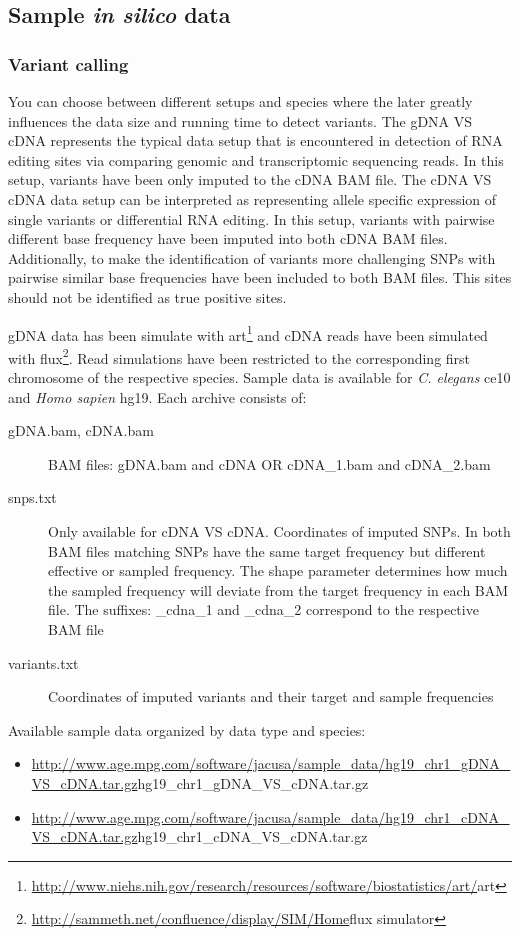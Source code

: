 \documentclass[10pt,a4paper,draft]{article}
\begin{document}
\subsection{Sample \textit{in silico} data}
\subsubsection{Variant calling}
You can choose between different setups and species where the later greatly influences the data size 
and running time to detect variants. The gDNA VS cDNA represents the typical data setup that is 
encountered in detection of RNA editing sites via comparing genomic and transcriptomic sequencing reads. 
In this setup, variants have been only imputed to the cDNA BAM file. The cDNA VS cDNA data setup can be interpreted as
representing allele specific expression of single variants or differential RNA editing. In this
setup, variants with pairwise different base frequency have been imputed into both cDNA BAM files.
Additionally, to make the identification of variants more challenging SNPs with pairwise similar base
frequencies have been included to both BAM files. This sites should not be identified as true
positive sites.

gDNA data has been simulate with
art\footnote{\url{http://www.niehs.nih.gov/research/resources/software/biostatistics/art/}{art}}
and cDNA reads have been simulated with
flux\footnote{\url{http://sammeth.net/confluence/display/SIM/Home}{flux simulator}}. Read
simulations have been restricted to the corresponding first chromosome of the respective species.
Sample data is available for \textit{C. elegans} ce10 and \textit{Homo sapien} hg19. Each archive
consists of:
\begin{description}
  \item[gDNA.bam, cDNA.bam] BAM files: gDNA.bam and cDNA OR cDNA\_1.bam and cDNA\_2.bam
  \item[snps.txt] Only available for cDNA VS cDNA. Coordinates of imputed SNPs. In both
  BAM files matching SNPs have the same target frequency but different effective or sampled
  frequency. The shape parameter determines how much the sampled frequency will deviate from the
  target frequency in each BAM file. The suffixes: \_cdna\_1 and \_cdna\_2 correspond to the
  respective BAM file
  \item[variants.txt] Coordinates of imputed variants and their target and sample
  frequencies
\end{description}
Available sample data organized by data type and species:
\begin{itemize}
  \item
  \url{http://www.age.mpg.com/software/jacusa/sample_data/hg19_chr1_gDNA_VS_cDNA.tar.gz}{hg19\_chr1\_gDNA\_VS\_cDNA.tar.gz}
  \item
  \url{http://www.age.mpg.com/software/jacusa/sample_data/hg19_chr1_cDNA_VS_cDNA.tar.gz}{hg19\_chr1\_cDNA\_VS\_cDNA.tar.gz}
\end{itemize}
\end{document}
